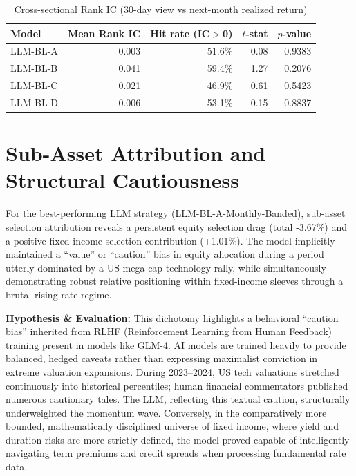 \documentclass[12pt]{report}
\begin{document}
\begin{table}[H]
    \centering
    \caption{Cross-sectional Rank IC (30-day view vs next-month realized return)}
    \label{tab:rankic}
    \begin{tabular}{lrrrr}
        \toprule
        Model    & Mean Rank IC & Hit rate (IC$>$0) & $t$-stat & $p$-value \\
        \midrule
        LLM-BL-A & 0.003        & 51.6\%            & 0.08     & 0.9383    \\
        LLM-BL-B & 0.041        & 59.4\%            & 1.27     & 0.2076    \\
        LLM-BL-C & 0.021        & 46.9\%            & 0.61     & 0.5423    \\
        LLM-BL-D & -0.006       & 53.1\%            & -0.15    & 0.8837    \\
        \bottomrule
    \end{tabular}
\end{table}

\section{Sub-Asset Attribution and Structural Cautiousness}
For the best-performing LLM strategy (LLM-BL-A-Monthly-Banded), sub-asset selection attribution reveals a persistent equity selection drag (total -3.67\%) and a positive fixed income selection contribution (+1.01\%).
The model implicitly maintained a ``value'' or ``caution'' bias in equity allocation during a period utterly dominated by a US mega-cap technology rally, while simultaneously demonstrating robust relative positioning within fixed-income sleeves through a brutal rising-rate regime.

\textbf{Hypothesis \& Evaluation:} This dichotomy highlights a behavioral ``caution bias'' inherited from RLHF (Reinforcement Learning from Human Feedback) training present in models like GLM-4. AI models are trained heavily to provide balanced, hedged caveats rather than expressing maximalist conviction in extreme valuation expansions. During 2023--2024, US tech valuations stretched continuously into historical percentiles; human financial commentators published numerous cautionary tales. The LLM, reflecting this textual caution, structurally underweighted the momentum wave. Conversely, in the comparatively more bounded, mathematically disciplined universe of fixed income, where yield and duration risks are more strictly defined, the model proved capable of intelligently navigating term premiums and credit spreads when processing fundamental rate data.
\end{document}
